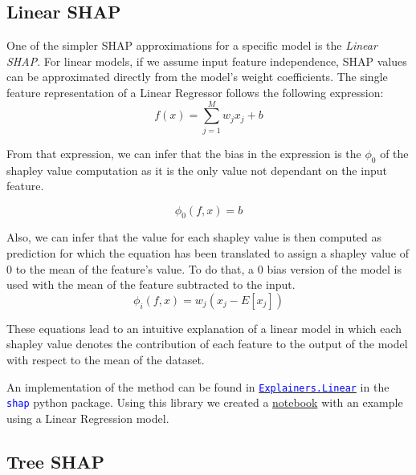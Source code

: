 \subsection{Linear SHAP}

One of the simpler SHAP approximations for a specific model is the \textit{Linear SHAP}.
For linear models, if we assume input feature independence, SHAP values can be approximated directly from the model’s weight coefficients. The single feature representation of a Linear Regressor follows the following expression:
$$f(x) = \sum_{j=1}^M w_jx_j + b$$

From that expression, we can infer that the bias in the expression is the $\phi_0$ of the shapley value computation as it is the only value not dependant on the input feature.

$$\phi_0(f,x) = b$$

Also, we can infer that the value for each shapley value is then computed as prediction for which the equation has been translated to assign a shapley value of 0 to the mean of the feature's value. To do that, a 0 bias version of the model is used with the mean of the feature subtracted to the input.
$$\phi_i(f,x)=w_j(x_j - E[x_j])$$

These equations lead to an intuitive explanation of a linear model in which each shapley value denotes the contribution of each feature to the output of the model with respect to the mean of the dataset.

An implementation of the method can be found in \texttt{\href{https://shap.readthedocs.io/en/latest/generated/shap.explainers.Linear.html}{\textcolor{blue}{Explainers.Linear}}} in the \texttt{{\textcolor{blue}{shap}}} python package. Using this library we created a \textcolor{blue}{\href{https://colab.research.google.com/drive/1DD9JseexE1JTSomZqn6ogjm5PpmmBvqt?usp=sharing} {notebook}} with an example using a Linear Regression model.



\subsection{Tree SHAP}

